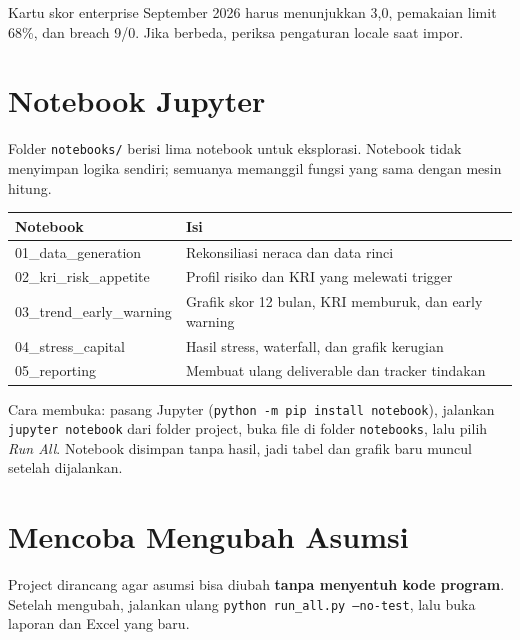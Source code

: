 \documentclass[11pt,a4paper]{article}
\newcommand{\file}[1]{\texttt{\small #1}}
\begin{document}
\begin{tipbox}
Kartu skor enterprise September 2026 harus menunjukkan 3{,}0, pemakaian limit 68\%, dan breach 9/0. Jika berbeda, periksa pengaturan locale saat impor.
\end{tipbox}

\section{Notebook Jupyter}\label{sec:notebook}

Folder \file{notebooks/} berisi lima notebook untuk eksplorasi. Notebook tidak menyimpan logika sendiri; semuanya memanggil fungsi yang sama dengan mesin hitung.

\begin{center}
\begin{tabularx}{\linewidth}{>{\ttfamily\small}p{5.2cm}X}
\toprule
\textrm{\textbf{Notebook}} & \textbf{Isi} \\
\midrule
01\_\allowbreak{}data\_\allowbreak{}generation & Rekonsiliasi neraca dan data rinci \\
02\_\allowbreak{}kri\_\allowbreak{}risk\_\allowbreak{}appetite & Profil risiko dan KRI yang melewati trigger \\
03\_\allowbreak{}trend\_\allowbreak{}early\_\allowbreak{}warning & Grafik skor 12 bulan, KRI memburuk, dan early warning \\
04\_\allowbreak{}stress\_\allowbreak{}capital & Hasil stress, waterfall, dan grafik kerugian \\
05\_\allowbreak{}reporting & Membuat ulang deliverable dan tracker tindakan \\
\bottomrule
\end{tabularx}
\end{center}

Cara membuka: pasang Jupyter (\texttt{python -m pip install notebook}), jalankan \texttt{jupyter notebook} dari folder project, buka file di folder \file{notebooks}, lalu pilih \emph{Run All}. Notebook disimpan tanpa hasil, jadi tabel dan grafik baru muncul setelah dijalankan.
\section{Mencoba Mengubah Asumsi}\label{sec:ubah}

Project dirancang agar asumsi bisa diubah \textbf{tanpa menyentuh kode program}. Setelah mengubah, jalankan ulang \texttt{python run\_\allowbreak{}all.py --no-test}, lalu buka laporan dan Excel yang baru.
\end{document}
